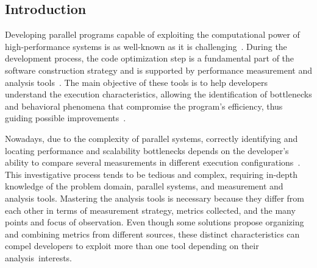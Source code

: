 \subsection{Introduction} \label{sec:introduction_pascal}

Developing parallel programs capable of exploiting the computational power of high-performance systems is as well-known as it is challenging~\cite{Huck2007, Islam2019, Weber2019}. 
During the development process, the code optimization step is a fundamental part of the software construction strategy and is supported by performance measurement and analysis tools~\cite{Bergel2019, Weber2019, Huck2005, Geimer2010, Shende2006, Adhianto2010, Miller1995, Galobardes2015, Pillet2007, Islam2019}. The main objective of these tools is to help developers understand the execution characteristics, allowing the identification of bottlenecks and behavioral phenomena that compromise the program’s efficiency, thus guiding possible improvements~\cite{Brink2020, Huck2007}.

Nowadays, due to the complexity of parallel systems, correctly identifying and locating performance and scalability bottlenecks depends on the developer's ability to compare several measurements in different execution configurations~\cite{Bergel2019, Silva2018}. This investigative process tends to be tedious and complex, requiring in-depth knowledge of the problem domain, parallel systems, and measurement and analysis tools. 
Mastering the analysis tools is necessary because they differ from each other in terms of measurement strategy, metrics collected, and the many points and focus of observation.
Even though some solutions propose organizing and combining metrics from different sources, these distinct characteristics can compel developers to exploit more than one tool depending on their analysis~interests.


